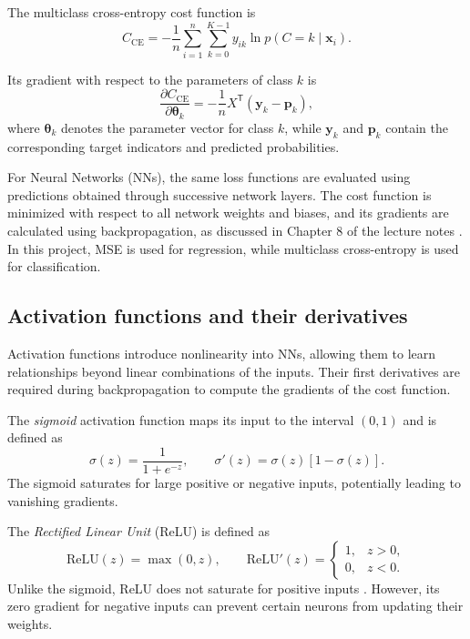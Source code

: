 \documentclass[aps,rmp,reprint,amsmath,amssymb,graphicx,longbibliography]{revtex4-1}
\begin{document}
The multiclass cross-entropy cost function is
\begin{equation}
    C_{\mathrm{CE}} =
    -\frac{1}{n}\sum_{i=1}^{n}\sum_{k=0}^{K-1}
    y_{ik}\ln p(C=k\mid\mathbf{x}_i).
\end{equation}

Its gradient with respect to the parameters of class $k$ is
\begin{equation}
    \frac{\partial C_{\mathrm{CE}}}
    {\partial\boldsymbol{\theta}_k}
    =-\frac{1}{n}X^{\mathsf T}
    (\mathbf{y}_k-\mathbf{p}_k),
\end{equation}
where $\boldsymbol{\theta}_k$ denotes the parameter vector for class
$k$, while $\mathbf{y}_k$ and $\mathbf{p}_k$ contain the corresponding
target indicators and predicted probabilities.

For Neural Networks (NNs), the same loss functions are evaluated using
predictions obtained through successive network layers. The cost
function is minimized with respect to all network weights and biases,
and its gradients are calculated using backpropagation, as discussed
in Chapter 8 of the lecture notes \cite{Book_Ch8}. In this project, MSE is used for
regression, while multiclass cross-entropy is used for classification.


\subsection{Activation functions and their derivatives}
\label{subsec:activation_functions}

Activation functions introduce nonlinearity into NNs, allowing
them to learn relationships beyond linear combinations of the inputs.
Their first derivatives are required during backpropagation to compute
the gradients of the cost function.

The \textit{sigmoid} activation function maps its input to the interval
$(0,1)$ \cite{Book_Ch8} and is defined as
\begin{equation}
    \sigma(z)=\frac{1}{1+e^{-z}},
    \qquad
    \sigma'(z)=\sigma(z)[1-\sigma(z)].
\end{equation}
The sigmoid saturates for large positive or negative inputs, potentially
leading to vanishing gradients.

The \textit{Rectified Linear Unit} (ReLU) is defined as
\begin{equation}
    \mathrm{ReLU}(z)=\max(0,z),
    \qquad
    \mathrm{ReLU}'(z)=
    \begin{cases}
        1, & z>0,\\
        0, & z<0.
    \end{cases}
\end{equation}
Unlike the sigmoid, ReLU does not saturate for positive inputs \cite{Book_Ch8}.
However, its zero gradient for negative inputs can prevent certain
neurons from updating their weights.
\end{document}
